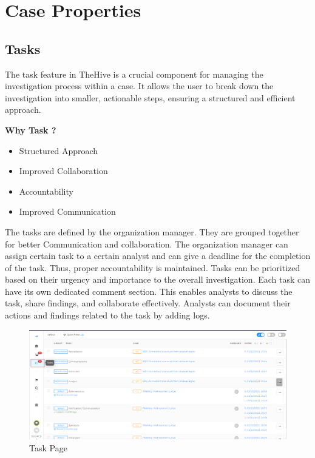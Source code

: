 \documentclass{book}
\begin{document}
\newpage

\section{Case Properties}
\subsection{Tasks}
The task feature in TheHive is a crucial component for managing the investigation process within a case. It allows the user to break down the investigation into smaller, actionable steps, ensuring a structured and efficient approach.
\bigskip

\textbf{Why Task ?}
\begin{itemize}
    \item Structured Approach
    \item Improved Collaboration
    \item Accountability
    \item Improved Communication
\end{itemize}
\bigskip

The tasks are defined by the organization manager. They are grouped together for better Communication and collaboration. 
\newline
\newline
The organization manager can assign certain task to a certain analyst and can give a deadline for the completion of the task. Thus, proper accountability is maintained.
\newline
\newline
 Tasks can be prioritized based on their urgency and importance to the overall investigation. 
\newline
\newline
Each task can have its own dedicated comment section. This enables analysts to discuss the task, share findings, and collaborate effectively. Analysts can document their actions and findings related to the task by adding logs. 

\bigskip
\begin{figure}[h]
    \centering
    \includegraphics[width=.8\linewidth]{Case_images/Task1.png}
    \caption{Task Page}
    \label{fig:task1}
\end{figure}
\end{document}

